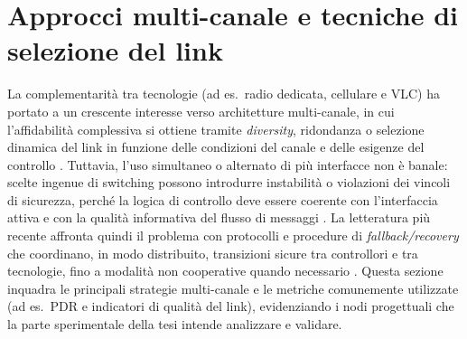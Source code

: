 \section{Approcci multi-canale e tecniche di selezione del link}
\label{sec:sota_multichannel}

La complementarità tra tecnologie (ad es.\ radio dedicata, cellulare e VLC) ha portato a un crescente interesse verso architetture multi-canale, in cui l’affidabilità complessiva si ottiene tramite \emph{diversity}, ridondanza o selezione dinamica del link in funzione delle condizioni del canale e delle esigenze del controllo \cite{hardes2019communication,ishihara2015improving}. Tuttavia, l’uso simultaneo o alternato di più interfacce non è banale: scelte ingenue di switching possono introdurre instabilità o violazioni dei vincoli di sicurezza, perché la logica di controllo deve essere coerente con l’interfaccia attiva e con la qualità informativa del flusso di messaggi \cite{giordano2019joint,segata2023multi-technology}. La letteratura più recente affronta quindi il problema con protocolli e procedure di \emph{fallback/recovery} che coordinano, in modo distribuito, transizioni sicure tra controllori e tra tecnologie, fino a modalità non cooperative quando necessario \cite{segata2023multi-technology}. Questa sezione inquadra le principali strategie multi-canale e le metriche comunemente utilizzate (ad es.\ PDR e indicatori di qualità del link), evidenziando i nodi progettuali che la parte sperimentale della tesi intende analizzare e validare.